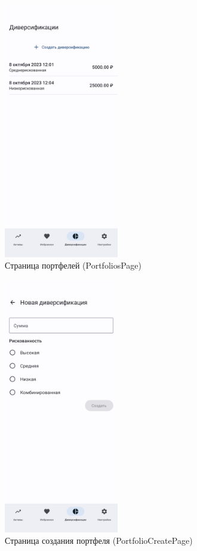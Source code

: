 \documentclass[a4paper, 14pt]{article}
\begin{document}
\begin{figure}[H]
    \centering
    \includegraphics[width=5cm]{resources/10.png}
    \caption{Страница портфелей (PortfoliosPage)}
\end{figure}

\begin{figure}[H]
    \centering
    \includegraphics[width=5cm]{resources/11.png}
    \caption{Страница создания портфеля (PortfolioCreatePage)}
\end{figure}
\end{document}
